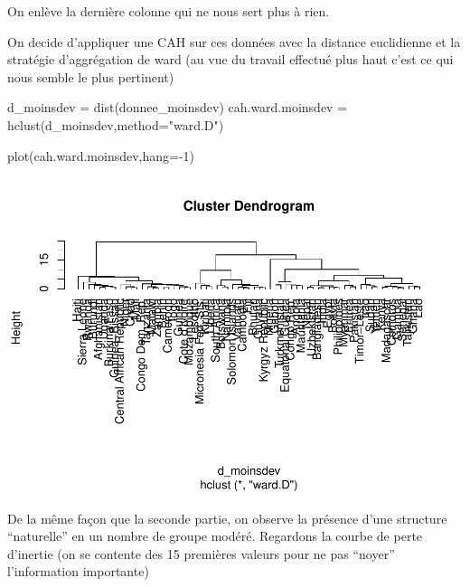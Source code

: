 \documentclass[
]{article}
\newenvironment{Shaded}{}{}
\newcommand{\AttributeTok}[1]{#1}
\newcommand{\DecValTok}[1]{#1}
\newcommand{\FunctionTok}[1]{#1}
\newcommand{\NormalTok}[1]{#1}
\newcommand{\OtherTok}[1]{\textcolor[rgb]{1.00,0.25,0.00}{#1}}
\newcommand{\SpecialCharTok}[1]{\textcolor[rgb]{0.00,0.50,0.50}{#1}}
\newcommand{\StringTok}[1]{\textcolor[rgb]{0.00,0.50,0.50}{#1}}
\begin{document}
On enlève la dernière colonne qui ne nous sert plus à rien.

On decide d'appliquer une CAH sur ces données avec la distance
euclidienne et la stratégie d'aggrégation de ward (au vue du travail
effectué plus haut c'est ce qui nous semble le plus pertinent)

\begin{Shaded}
\begin{Highlighting}[]
\NormalTok{d\_moinsdev }\OtherTok{=} \FunctionTok{dist}\NormalTok{(donnee\_moinsdev)}
\NormalTok{cah.ward.moinsdev }\OtherTok{=} \FunctionTok{hclust}\NormalTok{(d\_moinsdev,}\AttributeTok{method=}\StringTok{"ward.D"}\NormalTok{)}

\FunctionTok{plot}\NormalTok{(cah.ward.moinsdev,}\AttributeTok{hang=}\SpecialCharTok{{-}}\DecValTok{1}\NormalTok{)}
\end{Highlighting}
\end{Shaded}

\includegraphics{Projet_files/figure-latex/unnamed-chunk-32-1.pdf}

De la même façon que la seconde partie, on observe la présence d'une
structure ``naturelle'' en un nombre de groupe modéré. Regardons la
courbe de perte d'inertie (on se contente des 15 premières valeurs pour
ne pas ``noyer'' l'information importante)

\begin{Shaded}
\end{Shaded}
\end{document}
